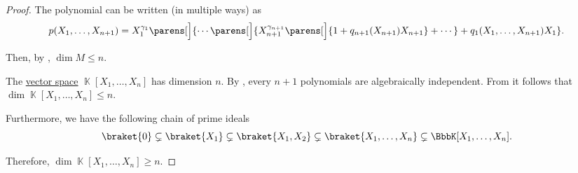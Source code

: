 \begin{proof}
  The polynomial can be written (in multiple ways) as
  \begin{equation*}
    p(X_1, \ldots, X_{n+1}) = X_1^{\gamma_1} \parens[\Big]{ \cdots \parens[\Big]{ X_{n+1}^{\gamma_{n+1}} \parens[\Big]{ 1 + q_{n+1}(X_{n+1}) X_{n+1} } + \cdots } + q_1(X_1, \ldots, X_{n+1}) X_1 }.
  \end{equation*}

  Then, by , \( \dim M \leq n \).

   The \hyperref[def:vector_space]{vector space} \( \BbbK[X_1, \ldots, X_n] \) has dimension \( n \). By , every \( n + 1 \) polynomials are algebraically independent. From  it follows that \( \dim \BbbK[X_1, \ldots, X_n] \leq n \).

  Furthermore, we have the following chain of prime ideals
  \begin{equation*}
    \braket{ 0 } \subsetneq \braket{ X_1 } \subsetneq \braket{ X_1, X_2 } \subsetneq \braket{ X_1, \ldots, X_n } \subsetneq \BbbK[X_1, \ldots, X_n].
  \end{equation*}

  Therefore, \( \dim \BbbK[X_1, \ldots, X_n] \geq n \).
\end{proof}

